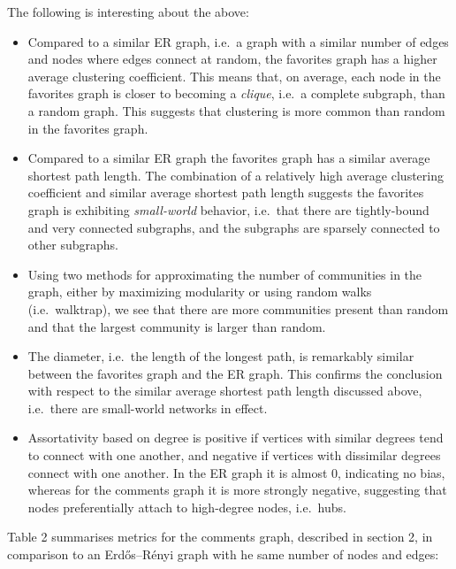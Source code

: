 The following is interesting about the above:

\begin{itemize}
\item
  Compared to a similar ER graph, i.e.~a graph with a similar number of
  edges and nodes where edges connect at random, the favorites graph has
  a higher average clustering coefficient. This means that, on average,
  each node in the favorites graph is closer to becoming a
  \emph{clique}, i.e.~a complete subgraph, than a random graph. This
  suggests that clustering is more common than random in the favorites
  graph.
\item
  Compared to a similar ER graph the favorites graph has a similar
  average shortest path length. The combination of a relatively high
  average clustering coefficient and similar average shortest path
  length suggests the favorites graph is exhibiting \emph{small-world}
  behavior, i.e.~that there are tightly-bound and very connected
  subgraphs, and the subgraphs are sparsely connected to other
  subgraphs.
\item
  Using two methods for approximating the number of communities in the
  graph, either by maximizing modularity or using random walks
  (i.e.~walktrap), we see that there are more communities present than
  random and that the largest community is larger than random.
\item
  The diameter, i.e.~the length of the longest path, is remarkably
  similar between the favorites graph and the ER graph. This confirms
  the conclusion with respect to the similar average shortest path
  length discussed above, i.e.~there are small-world networks in effect.
\item
  Assortativity based on degree is positive if vertices with similar
  degrees tend to connect with one another, and negative if vertices
  with dissimilar degrees connect with one another. In the ER graph it
  is almost 0, indicating no bias, whereas for the comments graph it is
  more strongly negative, suggesting that nodes preferentially attach to
  high-degree nodes, i.e.~hubs.
\end{itemize}

Table 2 summarises metrics for the comments graph, described in section
2, in comparison to an Erdős--Rényi graph with he same number of nodes
and edges:

